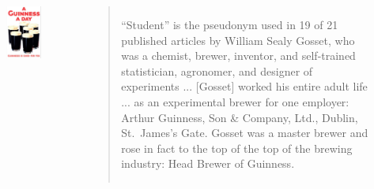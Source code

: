\begin{frame}
\begin{columns}
\begin{figure}
\includegraphics[scale = 0.15]{./images/guinness}
\end{figure}


\scriptsize
\begin{quote}
``Student'' is the pseudonym used in 19 of 21 published articles by William Sealy
Gosset, who was a chemist, brewer, inventor, and self-trained statistician, agronomer, and designer of experiments ... [Gosset] worked his entire adult life ... as an experimental brewer for one employer: Arthur Guinness, Son \& Company, Ltd., Dublin, St.\ James’s Gate. Gosset was a master brewer and rose in fact to the top of the top of the brewing industry: Head Brewer of Guinness.
\end{quote}

\end{columns}

\end{frame}


